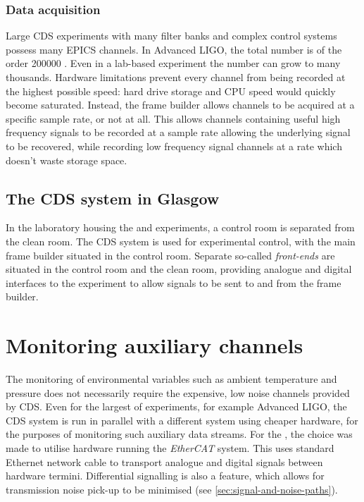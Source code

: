 \subsubsection{Data acquisition}
Large \gls{CDS} experiments with many filter banks and complex control systems possess many \gls{EPICS} channels. In Advanced LIGO, the total number is of the order \num{200000} \cite{aligonoise2016}. Even in a lab-based experiment the number can grow to many thousands. Hardware limitations prevent every channel from being recorded at the highest possible speed: hard drive storage and \gls{CPU} speed would quickly become saturated. Instead, the frame builder allows channels to be acquired at a specific sample rate, or not at all. This allows channels containing useful high frequency signals to be recorded at a sample rate allowing the underlying signal to be recovered, while recording low frequency signal channels at a rate which doesn't waste storage space.

\subsection{The CDS system in Glasgow}
In the laboratory housing the \GLASGOWTENM{} and \SSM{} experiments, a control room is separated from the clean room. The \gls{CDS} system is used for experimental control, with the main frame builder situated in the control room. Separate so-called \emph{front-ends} are situated in the control room and the clean room, providing analogue and digital interfaces to the experiment to allow signals to be sent to and from the frame builder.

\section{Monitoring auxiliary channels}
The monitoring of environmental variables such as ambient temperature and pressure does not necessarily require the expensive, low noise channels provided by \gls{CDS}. Even for the largest of experiments, for example Advanced LIGO, the \gls{CDS} system is run in parallel with a different system using cheaper hardware, for the purposes of monitoring such auxiliary data streams. For the \SSMEXPT{}, the choice was made to utilise hardware running the \emph{EtherCAT} system. This uses standard Ethernet network cable to transport analogue and digital signals between hardware termini. Differential signalling is also a feature, which allows for transmission noise pick-up to be minimised (see \ref{sec:signal-and-noise-paths}).

